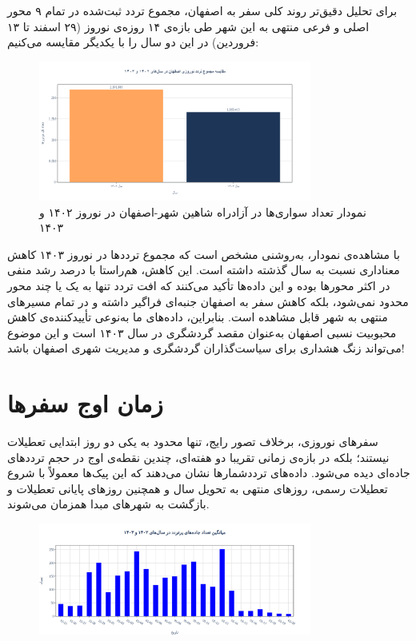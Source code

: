 \documentclass[a4paper, 12pt]{article}
\begin{document}
\newpage
برای تحلیل دقیق‌تر روند کلی سفر به اصفهان، مجموع تردد ثبت‌شده در تمام ۹ محور اصلی و فرعی منتهی به این شهر طی بازه‌ی ۱۴ روزه‌ی نوروز (۲۹ اسفند تا ۱۳ فروردین) در این دو سال را با یکدیگر مقایسه می‌کنیم:
\begin{figure}[htbp]
    \centering
    \includegraphics[width=0.8\textwidth]{all_isf.png}
    \caption{نمودار تعداد سواری‌ها در آزادراه شاهین شهر-اصفهان در نوروز ۱۴۰۲ و ۱۴۰۳}
\end{figure}
با مشاهده‌ی نمودار، به‌روشنی مشخص است که مجموع ترددها در نوروز ۱۴۰۳ کاهش معناداری نسبت به سال گذشته داشته است. این کاهش، هم‌راستا با درصد رشد منفی در اکثر محورها بوده و این داده‌ها تأکید می‌کنند که افت تردد تنها به یک یا چند محور محدود نمی‌شود، بلکه کاهش سفر به اصفهان جنبه‌ای فراگیر داشته و در تمام مسیرهای منتهی به شهر قابل مشاهده است. بنابراین، داده‌های ما به‌نوعی تأییدکننده‌ی کاهش محبوبیت نسبی اصفهان به‌عنوان مقصد گردشگری در سال ۱۴۰۳ است و این موضوع می‌تواند زنگ هشداری برای سیاست‌گذاران گردشگری و مدیریت شهری اصفهان باشد!


\newpage
\section{زمان اوج سفرها}
سفرهای نوروزی، برخلاف تصور رایج، تنها محدود به یکی دو روز ابتدایی تعطیلات نیستند؛ بلکه در بازه‌ی زمانی تقریبا دو هفته‌ای، چندین نقطه‌ی اوج در حجم ترددهای جاده‌ای دیده می‌شود. داده‌های ترددشمارها نشان می‌دهند که این پیک‌ها معمولاً با شروع تعطیلات رسمی، روزهای منتهی به تحویل سال و همچنین روزهای پایانی تعطیلات و بازگشت به شهرهای مبدا همزمان می‌شوند.

\begin{figure}[htbp]
    \centering
    \includegraphics[width=0.8\textwidth]{peaks-pics/count_mean.png}
\end{figure}
\end{document}
